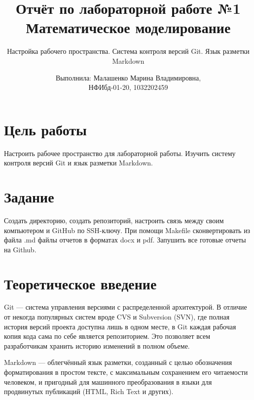\documentclass[
  12pt,
  a4paper,
]{scrreprt}
\title{Отчёт по лабораторной работе №1\\
Математическое моделирование}
\subtitle{Настройка рабочего пространства. Система контроля версий Git.
Язык разметки Markdown}
\author{Выполнила: Малашенко Марина Владимировна,\\
НФИбд-01-20, 1032202459}
\date{}
\begin{document}
\maketitle

\renewcommand*\contentsname{Содержание}
{
\setcounter{tocdepth}{2}
\tableofcontents
}
\listoffigures
{}
\hypertarget{ux446ux435ux43bux44c-ux440ux430ux431ux43eux442ux44b}{%
\chapter{Цель
работы}\label{ux446ux435ux43bux44c-ux440ux430ux431ux43eux442ux44b}}

Настроить рабочее пространство для лабораторной работы. Изучить систему
контроля версий Git и язык разметки Markdown.

\hypertarget{ux437ux430ux434ux430ux43dux438ux435}{%
\chapter{Задание}\label{ux437ux430ux434ux430ux43dux438ux435}}

Создать директорию, создать репозиторий, настроить связь между своим
компьютером и GitHub по SSH-ключу. При помощи Makefile сконвертировать
из файла .md файлы отчетов в форматах docx и pdf. Запушить все готовые
отчеты на Github.

\hypertarget{ux442ux435ux43eux440ux435ux442ux438ux447ux435ux441ux43aux43eux435-ux432ux432ux435ux434ux435ux43dux438ux435}{%
\chapter{Теоретическое
введение}\label{ux442ux435ux43eux440ux435ux442ux438ux447ux435ux441ux43aux43eux435-ux432ux432ux435ux434ux435ux43dux438ux435}}

Git — система управления версиями с распределенной архитектурой. В
отличие от некогда популярных систем вроде CVS и Subversion (SVN), где
полная история версий проекта доступна лишь в одном месте, в Git каждая
рабочая копия кода сама по себе является репозиторием. Это позволяет
всем разработчикам хранить историю изменений в полном объеме.

Markdown — облегчённый язык разметки, созданный с целью обозначения
форматирования в простом тексте, с максимальным сохранением его
читаемости человеком, и пригодный для машинного преобразования в языки
для продвинутых публикаций (HTML, Rich Text и других).
\end{document}
